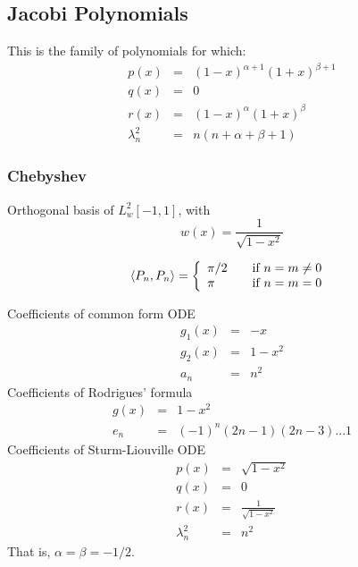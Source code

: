 \documentclass[oneside,a4paper,11pt]{article}
\begin{document}
\subsection{Jacobi Polynomials}
This is the family of polynomials for which:
\begin{eqnarray*}
p(x) &=& (1 - x)^{\alpha + 1}(1+x)^{\beta + 1}\\
q(x) &=& 0\\
r(x) &=& (1 - x)^\alpha(1+x)^\beta \\
\lambda_n^2 &=& n(n + \alpha + \beta + 1)
\end{eqnarray*}

\subsubsection{Chebyshev}
Orthogonal basis of $L^2_w[-1,1]$, with
\[w(x) = \frac{1}{\sqrt{1 - x^2}}\] 

\[\langle P_n,P_n\rangle = \left\{ 
  \begin{array}{l l}
    \pi/2 & \quad \text{if $n = m \neq 0$ }\\
    \pi & \quad \text{if $n=m=0$ }
  \end{array} \right.\]
  
Coefficients of common form ODE
\begin{eqnarray*}
g_1(x) &=& -x\\
g_2(x) &=& 1 - x^2\\
a_n &=& n^2
\end{eqnarray*}
Coefficients of Rodrigues' formula
 \begin{eqnarray*}
g(x) &=& 1 - x^2\\
e_n &=& (-1)^n(2n-1)(2n-3)...1
\end{eqnarray*}
Coefficients of Sturm-Liouville ODE
\begin{eqnarray*}
p(x) &=& \sqrt{1 - x^2}\\
q(x) &=& 0\\
r(x) &=& \frac{1}{\sqrt{1 - x^2}}\\
\lambda^2_n &=& n^2
\end{eqnarray*}
That is, $\alpha = \beta = -1/2$.
\end{document}
